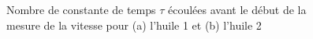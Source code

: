 \begin{figure}[H]
\begin{subfigure}{0.48\linewidth}
        \caption{}
        \label{fig:huile2_tau}
    \end{subfigure}
    \caption{Nombre de constante de temps $\tau$ écoulées avant le début de la mesure de la vitesse pour (a) l'huile 1 et (b) l'huile 2}
\end{figure}